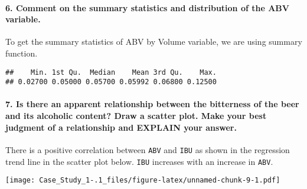 \documentclass[]{article}
\newenvironment{Shaded}{\begin{snugshade}}{\end{snugshade}}
\newcommand{\CommentTok}[1]{\textcolor[rgb]{0.56,0.35,0.01}{\textit{#1}}}
\newcommand{\DataTypeTok}[1]{\textcolor[rgb]{0.13,0.29,0.53}{#1}}
\newcommand{\FloatTok}[1]{\textcolor[rgb]{0.00,0.00,0.81}{#1}}
\newcommand{\KeywordTok}[1]{\textcolor[rgb]{0.13,0.29,0.53}{\textbf{#1}}}
\newcommand{\NormalTok}[1]{#1}
\newcommand{\OperatorTok}[1]{\textcolor[rgb]{0.81,0.36,0.00}{\textbf{#1}}}
\newcommand{\OtherTok}[1]{\textcolor[rgb]{0.56,0.35,0.01}{#1}}
\newcommand{\StringTok}[1]{\textcolor[rgb]{0.31,0.60,0.02}{#1}}
\let\oldparagraph\paragraph
\renewcommand{\paragraph}[1]{\oldparagraph{#1}\mbox{}}
\begin{document}
\hypertarget{comment-on-the-summary-statistics-and-distribution-of-the-abv-variable.}{%
\paragraph{6. Comment on the summary statistics and distribution of the
ABV
variable.}\label{comment-on-the-summary-statistics-and-distribution-of-the-abv-variable.}}

To get the summary statistics of ABV by Volume variable, we are using
summary function.

\begin{Shaded}
\end{Shaded}

\begin{verbatim}
##    Min. 1st Qu.  Median    Mean 3rd Qu.    Max. 
## 0.02700 0.05000 0.05700 0.05992 0.06800 0.12500
\end{verbatim}

\hypertarget{is-there-an-apparent-relationship-between-the-bitterness-of-the-beer-and-its-alcoholic-content-draw-a-scatter-plot.-make-your-best-judgment-of-a-relationship-and-explain-your-answer.}{%
\paragraph{7. Is there an apparent relationship between the bitterness
of the beer and its alcoholic content? Draw a scatter plot. Make your
best judgment of a relationship and EXPLAIN your
answer.}\label{is-there-an-apparent-relationship-between-the-bitterness-of-the-beer-and-its-alcoholic-content-draw-a-scatter-plot.-make-your-best-judgment-of-a-relationship-and-explain-your-answer.}}

There is a positive correlation between \texttt{ABV} and \texttt{IBU} as
shown in the regression trend line in the scatter plot below.
\texttt{IBU} increases with an increase in \texttt{ABV}.

\begin{Shaded}
\end{Shaded}

\texttt{[image: Case\_Study\_1-.1\_files/figure-latex/unnamed-chunk-9-1.pdf]}
\end{document}
